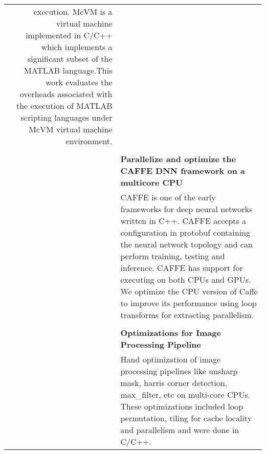 \documentclass[a4paper,10pt]{article} %
\begin{document}
\begin{tabular}{rp{13cm}}
execution. McVM is a
virtual machine implemented in C/C++ which implements a significant subset of
the MATLAB language.This work evaluates the overheads associated with the execution of
MATLAB scripting languages under McVM virtual machine environment.\\
& \\
& \textbf{Parallelize and optimize the CAFFE DNN framework on a multicore CPU}\\
& \setlength{\leftskip}{0.4cm}
CAFFE is one of the early frameworks for deep neural networks written in C++. CAFFE accepts a configuration in protobuf containing the neural network topology and can perform training, testing and inference. CAFFE has support for executing  on both CPUs and GPUs. We optimize the CPU version of Caffe to improve its performance using loop transforms for extracting parallelism.\\
&\\
& \textbf{Optimizations for Image Processing Pipeline} \\
& \setlength{\leftskip}{0.4cm}
Hand optimization of image processing pipelines like unsharp mask, harris corner detection, max\_filter, etc on multi-core CPUs. These optimizations included loop permutation, tiling for cache locality and parallelism and were done in C/C++.\\
\end{tabular}
\end{document}
